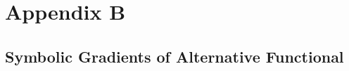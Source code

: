 
\chapter{Appendix B}\label{app:appendixB}



\section{Symbolic Gradients of Alternative Functional}